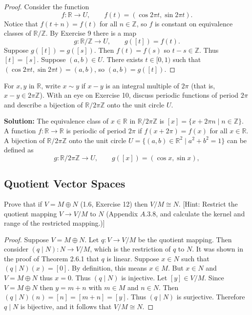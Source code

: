 \begin{proof}
    Consider the function
    \[
    f : \mathbb{R} \longrightarrow U, \qquad f(t) = (\cos 2\pi t, \sin 2\pi t).
    \]
    Notice that $f(t + n) = f(t)$ for all $n \in \mathbb{Z}$, so $f$ is constant on equivalence classes of $\mathbb{R}/\mathbb{Z}$.
    By Exercise 9 there is a map
    \[
    g : \mathbb{R}/\mathbb{Z} \longrightarrow U, \qquad g([t]) = f(t).
    \]
    Suppose $g([t]) = g([s])$. Then $f(t) = f(s)$ so $t - s \in \mathbb{Z}$. Thus $[t] = [s]$.
    Suppose $(a,b) \in U$. There exists $t \in [0,1)$ such that $(\cos 2\pi t, \sin 2\pi t) = (a,b)$, so $(a,b) = g([t])$.
\end{proof}

\begin{tcolorbox}[title=Problem 11, breakable]
    For $x, y$ in $\mathbb{R}$, write $x \sim y$ if $x - y$ is an integral multiple of $2 \pi$
    (that is, $x - y \in 2 \pi \mathbb{Z}$). With an eye on Exercise 10, discuss periodic functions 
    of period $2 \pi$ and describe a bijection of $\mathbb{R} / 2 \pi \mathbb{Z}$ onto the unit circle $U$.
\end{tcolorbox}

\textbf{Solution: }  
The equivalence class of $x \in \mathbb{R}$ in $\mathbb{R} / 2\pi \mathbb{Z}$ is $[x] = \{ x + 2 \pi n \mid n \in \mathbb{Z} \}$.
A function $f : \mathbb{R} \longrightarrow \mathbb{R}$ is periodic of period $2\pi$ if $f(x + 2 \pi) = f(x)$ for all $x \in \mathbb{R}$.
A bijection of $\mathbb{R}/2\pi \mathbb{Z}$ onto the unit circle $U = \{(a,b) \in \mathbb{R}^2 \mid a^2+b^2 = 1\}$ 
can be defined as
\[
g : \mathbb{R}/2\pi \mathbb{Z} \longrightarrow U, \qquad g([x]) = (\cos x, \sin x),
\]

\subsection{Quotient Vector Spaces}


\begin{tcolorbox}[title=Problem 1, breakable]
    Prove that if $V = M \oplus N$ (1.6, Exercise 12) then $V / M \cong N$.
    [Hint: Restrict the quotient mapping $V \longrightarrow V / M$ to $N$ 
    (Appendix $A.3.8$, and calculate the kernel and range of the restricted mapping.)]
\end{tcolorbox}

\begin{proof}
    Suppose $V = M \oplus N$.
    Let $q : V \longrightarrow V / M$ be the quotient mapping.
    Then consider $(q \mid N) : N \longrightarrow V / M$, which is the restriction 
    of $q$ to $N$.
    It was shown in the proof of Theorem 2.6.1 that $q$ is linear.
    Suppose $x \in N$ such that $(q \mid N)(x) = [0]$.  
    By definition, this means $x \in M$.  
    But $x \in N$ and $V = M \oplus N$ thus $x = 0$.  
    Thus $(q \mid N)$ is injective.
    Let $[y] \in V / M$.  
    Since $V = M \oplus N$ then $y = m + n$ with $m \in M$ and $n \in N$.  
    Then $(q \mid N)(n) = [n] = [m + n] = [y]$.  
    Thus $(q \mid N)$ is surjective.
    Therefore $q \mid N$ is bijective, and it follows that $V / M \cong N$.
\end{proof}

